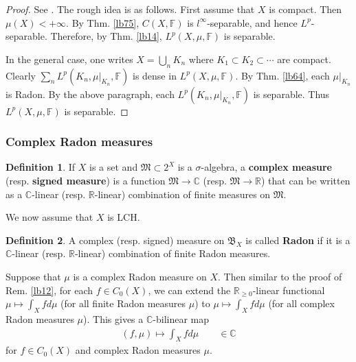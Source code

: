 \documentclass[12pt,b5paper,notitlepage]{article}
\theoremstyle{definition}
\newtheorem{df}{Definition}[subsection]
\theoremstyle{plain}
\newcommand{\fk}{\mathfrak}
\newcommand{\Cbb}{\mathbb C}
\newcommand{\Rbb}{\mathbb R}
\newcommand{\Fbb}{\mathbb F}
\numberwithin{equation}{section}
\begin{document}
\begin{proof}
See \cite[Sec. 27.2]{Gui-A}. The rough idea is as follows. First assume that $X$ is compact. Then $\mu(X)<+\infty$. By Thm. \ref{lb75}, $C(X,\Fbb)$ is $l^\infty$-separable, and hence $L^p$-separable. Therefore, by Thm. \ref{lb14}, $L^p(X,\mu,\Fbb)$ is separable.

In the general case, one writes $X=\bigcup_n K_n$ where $K_1\subset K_2\subset\cdots$ are compact. Clearly $\sum_n L^p(K_n,\mu|_{K_n},\Fbb)$ is dense in $L^p(X,\mu,\Fbb)$. By Thm. \ref{lb64}, each $\mu|_{K_n}$ is Radon. By the above paragraph, each $L^p(K_n,\mu|_{K_n},\Fbb)$ is separable. Thus $L^p(X,\mu,\Fbb)$ is separable.
\end{proof}






\subsubsection{Complex Radon measures}


\begin{df}
If $X$ is a set and $\fk M\subset 2^X$ is a $\sigma$-algebra, a \textbf{complex measure}  (resp. \textbf{signed measure})  is a function $\fk M\rightarrow \Cbb$ (resp. $\fk M\rightarrow\Rbb$) that can be written as a $\Cbb$-linear (resp. $\Rbb$-linear) combination of finite measures on $\fk M$.
\end{df}



We now assume that $X$ is LCH. 

\begin{df}
A complex (resp. signed) measure on $\fk B_X$ is called \textbf{Radon} if it is a $\Cbb$-linear (resp. $\Rbb$-linear) combination of finite Radon measures. 
\end{df}

Suppose that $\mu$ is a complex Radon measure on $X$. Then similar to the proof of Rem. \ref{lb12}, for each $f\in C_0(X)$, we can extend the $\Rbb_{\geq0}$-linear functional $\mu\mapsto\int_X fd\mu$ (for all finite Radon measures $\mu$) to $\mu\mapsto \int_X fd\mu$ (for all complex Radon measures $\mu$). This gives a $\Cbb$-bilinear map
\begin{align*}
(f,\mu)\mapsto\int_X fd\mu\qquad\in\Cbb
\end{align*}
for $f\in C_0(X)$ and complex Radon measures $\mu$.
\end{document}
